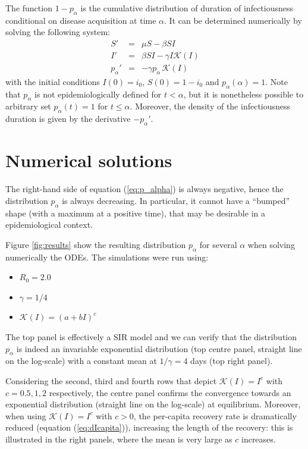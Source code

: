 \documentclass[12pt, twocolumn]{article}   	%
\newcommand{\K}{\mathcal{K}}
\newcommand{\eqref}[1]{(\ref{#1})}
\begin{document}
The function $1-p_\alpha$ is the cumulative distribution of duration of infectiousness conditional on disease acquisition at time $\alpha$. It can be determined numerically by solving the following system:
\begin{eqnarray}
S' & = & \mu S - \beta SI \\
I' & = & \beta S I - \gamma I \K(I)\\ 
p_\alpha' & = & - \gamma p_\alpha\, \K(I) \label{eq:p_alpha}
\end{eqnarray}
with the initial conditions $I(0) = i_0$, $S(0)=1-i_0$ and $p_\alpha(\alpha)=1$. Note that $p_\alpha$ is not epidemiologically defined for $t<\alpha$, but it is nonetheless possible to arbitrary set $p_\alpha(t)=1$ for $t\leq \alpha$. Moreover, the density of the infectiousness duration is given by the derivative $-p_\alpha'$.

\section{Numerical solutions}

The right-hand side of equation \eqref{eq:p_alpha} is always negative, hence the distribution $p_\alpha$ is always decreasing. In particular, it cannot have a ``bumped'' shape (with a maximum at a positive time), that may be desirable in a epidemiological context. 

Figure \ref{fig:results} show the resulting distribution $p_\alpha$ for several $\alpha$ when solving numerically the ODEs. The simulations were run using:
\begin{itemize}
\item $R_0 = 2.0$
\item $\gamma = 1/4$
\item $\K(I) = (a+bI)^c$
\end{itemize}

The top panel is effectively a SIR model and we can verify that the distribution $p_\alpha$ is indeed an invariable exponential distribution (top centre panel, straight line on the log-scale) with a constant mean at $1/\gamma = 4$ days (top right panel).

Considering the second, third and fourth rows that depict $\K(I)=I^c$ with $c=0.5,1,2$ respectively, the centre panel confirms the convergence towards an exponential distribution (straight line on the log-scale) at equilibrium. Moreover, when using $\K(I)=I^c$ with $c>0$, the per-capita recovery rate is dramatically reduced (equation \eqref{eq:dIcapita}), increasing the length of the recovery: this is illustrated in the right panels, where the mean is very large as $c$ increases. 
\end{document}

